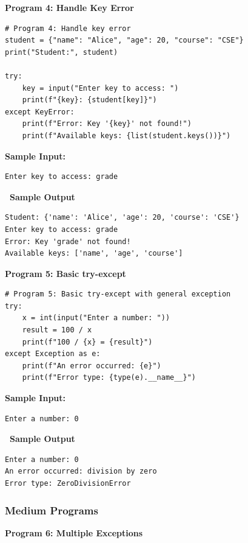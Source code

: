 \documentclass[12pt,a4paper]{article}
\newcommand{\outhead}{\noindent\colorbox{cmrgreen!25}%
  {\textbf{\small\color{cmrdark}~Sample Output~}}\par\vspace{-1pt}}
\begin{document}
\vspace{0.5cm}

\textbf{Program 4: Handle Key Error}

\begin{lstlisting}
# Program 4: Handle key error
student = {"name": "Alice", "age": 20, "course": "CSE"}
print("Student:", student)

try:
    key = input("Enter key to access: ")
    print(f"{key}: {student[key]}")
except KeyError:
    print(f"Error: Key '{key}' not found!")
    print(f"Available keys: {list(student.keys())}")
\end{lstlisting}

\textbf{Sample Input:}
\begin{verbatim}
Enter key to access: grade
\end{verbatim}

\outhead
\begin{lstlisting}[style=outputstyle]
Student: {'name': 'Alice', 'age': 20, 'course': 'CSE'}
Enter key to access: grade
Error: Key 'grade' not found!
Available keys: ['name', 'age', 'course']
\end{lstlisting}

\vspace{0.5cm}

\textbf{Program 5: Basic try-except}

\begin{lstlisting}
# Program 5: Basic try-except with general exception
try:
    x = int(input("Enter a number: "))
    result = 100 / x
    print(f"100 / {x} = {result}")
except Exception as e:
    print(f"An error occurred: {e}")
    print(f"Error type: {type(e).__name__}")
\end{lstlisting}

\textbf{Sample Input:}
\begin{verbatim}
Enter a number: 0
\end{verbatim}

\outhead
\begin{lstlisting}[style=outputstyle]
Enter a number: 0
An error occurred: division by zero
Error type: ZeroDivisionError
\end{lstlisting}

\subsubsection{Medium Programs}

\textbf{Program 6: Multiple Exceptions}
\end{document}
